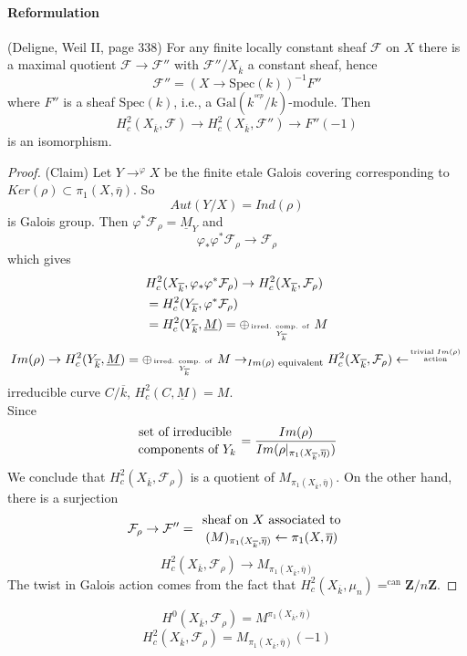 \paragraph{Reformulation} (Deligne, Weil II, page 338) For any finite locally constant sheaf $\mathcal{F}$ on $X$ there is a maximal quotient $\mathcal{F}\to \mathcal{F}''$ with $\mathcal{F}''/X_{\overline k}$ a constant sheaf, hence 
	$$\mathcal{F}'' = (X\to \text{Spec}(k))^{-1}F''$$
	where $F''$ is a sheaf $\text{Spec}(k)$, i.e., a $\text{Gal}(k^{^{sep}}/k)$-module. Then
	$$H_c^2(X_{\overline k}, \mathcal{F})\to H_c^2(X_{\overline k}, \mathcal{F}'')\to F''(-1)$$
	is an isomorphism. 
\begin{proof}(Claim) Let $Y\to^{\varphi}X$ be the finite etale Galois covering corresponding to $Ker(\rho)\subset \pi_1(X, \overline\eta)$. So 
	$$Aut(Y/X)=Ind(\rho)$$
	is Galois group. Then $\varphi^*\mathcal{F}_\rho =\underline M_Y$ and
		$$\varphi_*\varphi^*\mathcal{F}_\rho\to \mathcal{F}_\rho$$
		which gives
		\begin{align*}
		&H_c^2(X_{\overline k}, \varphi_*\varphi^*\mathcal{F}_\rho) \to H_c^2(X_{\overline k}, \mathcal{F}_\rho)\\
		&=H_c^2(Y_{\overline k}, \varphi^*\mathcal{F}_\rho)\\
		&=H_c^2(Y_{\overline k}, \underline M) = \oplus_{\text{irred. comp. of }\atop Y_{\overline k}}M
		\end{align*}
		$$Im(\rho)\rightarrow H_c^2(Y_{\overline k}, \underline M) = \oplus_{\text{irred. comp. of }\atop Y_{\overline k}}M\to_{Im(\rho)\text{ equivalent}} H_c^2(X_{\overline k}, \mathcal{F}_{\rho})\leftarrow^{\text{trivial }Im(\rho)\atop \text{action}}$$
		irreducible curve $C/\overline k$, $H_c^2(C, \underline M)=M$. \\
Since
	$${\text{set of irreducible }\atop\text{components of }Y_k} = \frac{Im(\rho)}{Im(\rho|_{\pi_1(X_{\overline k}, \overline \eta)})}$$
	We conclude that $H_c^2(X_{\overline k}, \mathcal{F}_\rho)$ is a quotient of $M_{\pi_1(X_{\overline k}, \overline \eta)}$. On the other hand, there is a surjection
		$$\mathcal{F}_\rho\to \mathcal{F}'' = {\text{ sheaf on } X\text{ associated to }\atop (M)_{\pi_1(X_{\overline k}, \overline \eta)}\leftarrow\pi_1(X, \overline \eta)}$$
			$$H_c^2(X_{\overline k}, \mathcal{F}_\rho)\to M_{\pi_1(X_{\overline k}, \overline\eta)}$$
			The twist in Galois action comes from the fact that $H_c^2(X_{\overline k}, \mu_n)=^{\text{can}} \mathbf{Z}/n\mathbf{Z}$. 
\end{proof}
	$$H^0(X_{\overline k}, \mathcal{F}_\rho) = M^{\pi_1(X_{\overline k}, \overline\eta)}$$
	$$H_c^2(X_{\overline k}, \mathcal{F}_\rho) = M_{\pi_1(X_{\overline k}, \overline \eta)}(-1)$$
	

